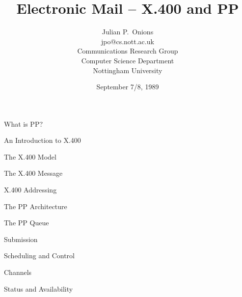 

\raggedright


\title	{Electronic Mail -- X.400 and PP}

\author{Julian P.~Onions\\
jpo@cs.nott.ac.uk\\[.5in]
Communications Research Group\\
Computer Science Department\\
Nottingham University
}

\date	{September 7/8, 1989}

\maketitle

\begin{bwslide}
\begin{nrtc}
\item	What is PP?

\item	An Introduction to X.400

\item	The X.400 Model

\item	The X.400 Message

\item	X.400 Addressing

\item	The PP Architecture

\item	The PP Queue

\item	Submission

\item	Scheduling and Control

\item	Channels

\item	Status and Availability
\end{nrtc}
\end{bwslide}

